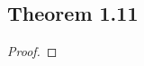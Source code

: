 \documentclass[../../main.tex]{subfiles}
\begin{document}
\subsection{Theorem 1.11}
\begin{wts}

\end{wts}
\begin{proof}

\end{proof}
\end{document}
